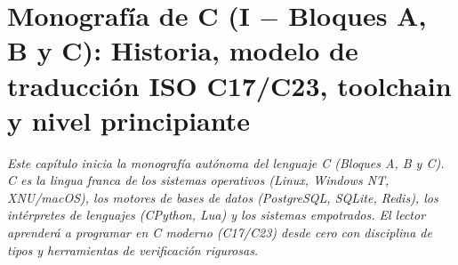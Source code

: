 \documentclass{book}
\begin{document}
\chapter{Monografía de C (I \(-\) Bloques A, B y C): Historia, modelo de traducción ISO C17/C23, toolchain y nivel principiante}
\label{chap:cap01-c-fundamentos-modelo-compilacion-tipos-principiante}

\noindent\textit{Este capítulo inicia la monografía autónoma del lenguaje C (Bloques A, B y C). C es la lingua franca de los sistemas operativos (Linux, Windows NT, XNU/macOS), los motores de bases de datos (PostgreSQL, SQLite, Redis), los intérpretes de lenguajes (CPython, Lua) y los sistemas empotrados. El lector aprenderá a programar en C moderno (C17/C23) desde cero con disciplina de tipos y herramientas de verificación rigurosas.}
\end{document}
